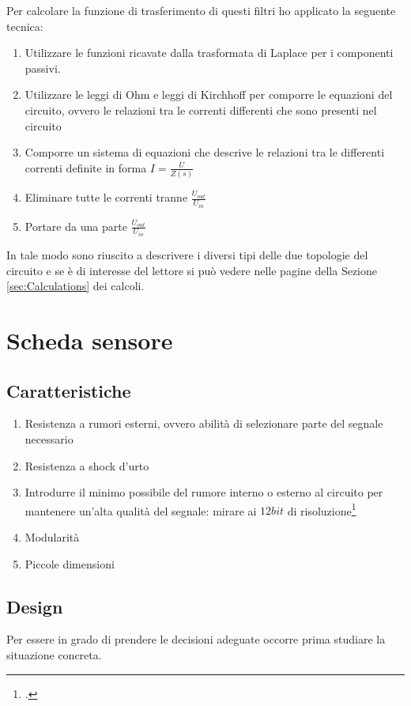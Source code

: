 \documentclass[a4paper, 10pt, final]{article} %
\begin{document}
    \noindent Per calcolare la funzione di trasferimento di questi filtri ho applicato la seguente tecnica:
    \begin{enumerate}[label=\emph{(\roman*)}]
        \item Utilizzare le funzioni ricavate dalla trasformata di Laplace per i componenti passivi.
        \item Utilizzare le leggi di Ohm e leggi di Kirchhoff per comporre le equazioni del circuito, ovvero le relazioni tra le correnti differenti che sono presenti nel circuito
        \item Comporre un sistema di equazioni che descrive le relazioni tra le differenti correnti definite in forma $I=\frac{U}{Z(s)}$
        \item Eliminare tutte le correnti tranne $\frac{U_{out}}{U_{in}}$
        \item Portare da una parte $\frac{U_{out}}{U_{in}}$
    \end{enumerate}
    In tale modo sono riuscito a descrivere i diversi tipi delle due topologie del circuito e se \`{e} di interesse del lettore si pu\`{o} vedere nelle pagine della Sezione \ref{sec:Calculations} dei calcoli.

    \clearpage
    \section{Scheda sensore}\label{sec:Sensorboard}
    \subsection{Caratteristiche}\label{sec:SensorboardCharacteristics}
    \begin{enumerate}[label=\emph{(\arabic*)}]
        \item Resistenza a rumori esterni, ovvero abilit\`{a} di selezionare parte del segnale necessario
        \item Resistenza a shock d'urto
        \item Introdurre il minimo possibile del rumore interno o esterno al circuito per mantenere un'alta qualit\`{a} del segnale: mirare ai $12bit$ di risoluzione\footcite[p9]{EMGBitdepth}
        \item Modularit\`{a}
        \item Piccole dimensioni
    \end{enumerate}

    \subsection{Design}\label{sec:SensorboardDesign}
    Per essere in grado di prendere le decisioni adeguate occorre prima studiare la situazione concreta.
\end{document}
